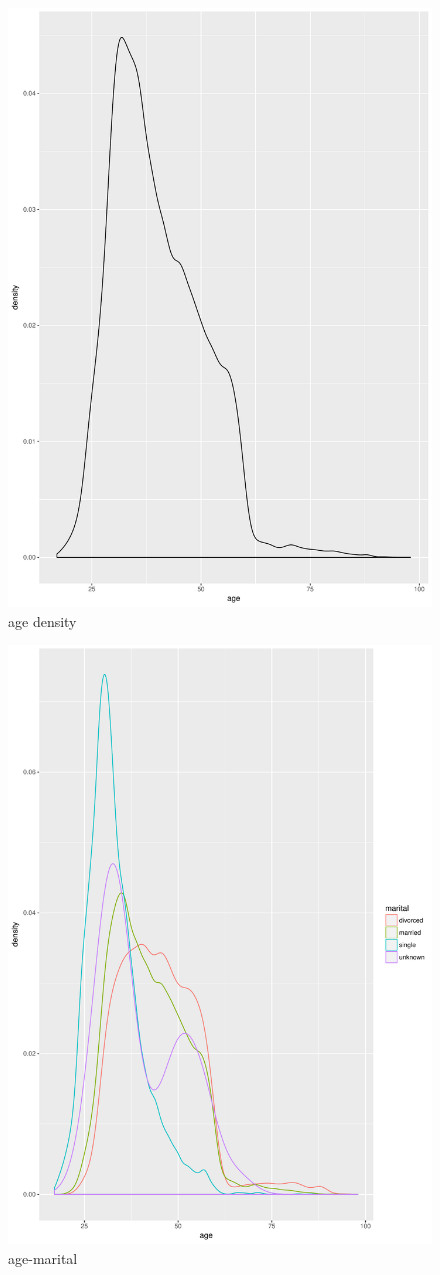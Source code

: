 \documentclass[12pt, a4paper, bibliography=totoc, english]{scrartcl}
\begin{document}
\begin{figure}
	\centering
	\includegraphics[width=0.7\linewidth]{Plot2}
	\caption{age density}
	\label{fig:plot2}
\end{figure}

\begin{figure}
	\centering
	\includegraphics[width=0.7\linewidth]{Plot3}
	\caption{age-marital}
	\label{fig:plot3}
\end{figure}
\end{document}
